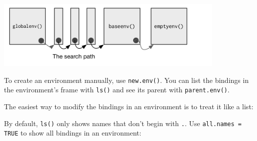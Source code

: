 \includegraphics[width=4.35in]{diagrams/environments.png/search-path.png}

To create an environment manually, use \texttt{new.env()}. You can list
the bindings in the environment's frame with \texttt{ls()} and see its
parent with \texttt{parent.env()}. 

\begin{Shaded}
\begin{Highlighting}[]
\StringTok{ }\NormalTok{()}
\end{Highlighting}
\end{Shaded}

The easiest way to modify the bindings in an environment is to treat it
like a list:

\begin{Shaded}
\begin{Highlighting}[]
\StringTok{ }
\StringTok{ }
\end{Highlighting}
\end{Shaded}

By default, \texttt{ls()} only shows names that don't begin with
\texttt{.}. Use \texttt{all.names = TRUE} to show all bindings in an
environment: 

\begin{Shaded}
\begin{Highlighting}[]
\StringTok{ }
 \NormalTok{)}
\end{Highlighting}
\end{Shaded}

